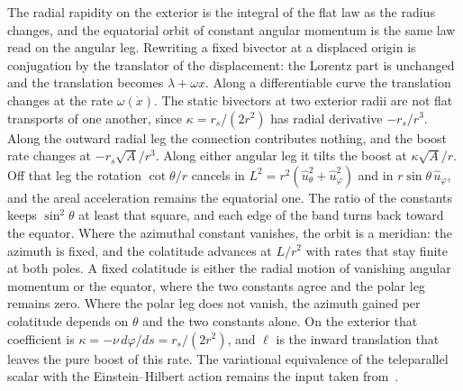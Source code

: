\documentclass[a4paper]{article}
\begin{document}
The radial rapidity on the exterior is the integral of the flat law as the radius changes, and the equatorial orbit of constant angular momentum is the same law read on the angular leg. Rewriting a fixed bivector at a displaced origin is conjugation by the translator of the displacement: the Lorentz part is unchanged and the translation becomes \(\lambda+\omega x\). Along a differentiable curve the translation changes at the rate \(\omega(\dot{x})\). The static bivectors at two exterior radii are not flat transports of one another, since \(\kappa=r_{s}/(2r^{2})\) has radial derivative \(-r_{s}/r^{3}\). Along the outward radial leg the connection contributes nothing, and the boost rate changes at \(-r_{s}\sqrt{A}/r^{3}\). Along either angular leg it tilts the boost at \(\kappa\sqrt{A}/r\). Off that leg the rotation \(\cot\theta/r\) cancels in \(L^{2}=r^{2}(\hat{u}_{\theta}^{2}+\hat{u}_{\varphi}^{2})\) and in \(r\sin\theta\,\hat{u}_{\varphi}\), and the areal acceleration remains the equatorial one. The ratio of the constants keeps \(\sin^{2}\theta\) at least that square, and each edge of the band turns back toward the equator. Where the azimuthal constant vanishes, the orbit is a meridian: the azimuth is fixed, and the colatitude advances at \(L/r^{2}\) with rates that stay finite at both poles. A fixed colatitude is either the radial motion of vanishing angular momentum or the equator, where the two constants agree and the polar leg remains zero. Where the polar leg does not vanish, the azimuth gained per colatitude depends on \(\theta\) and the two constants alone. On the exterior that coefficient is \(\kappa=-\nu\,d\varphi/ds=r_{s}/(2r^{2})\), and \(\ell\) is the inward translation that leaves the pure boost of this rate. The variational equivalence of the teleparallel scalar with the Einstein--Hilbert action remains the input taken from~\cite{maluf2013}.
\end{document}
